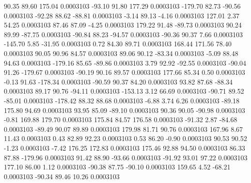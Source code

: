        90.35       89.60      175.04     0.0003103
      -93.10       91.80      177.29     0.0003103
     -179.70       82.73      -90.56     0.0003103
      -92.28       88.62      -88.81     0.0003103
       -3.14       89.13       -4.16     0.0003103
      127.01        2.37       54.25     0.0003103
       87.46       87.09       -4.25     0.0003103
      179.22       91.48      -89.73     0.0003103
       90.24       89.99      -87.75     0.0003103
      -90.84       88.23      -94.57     0.0003103
      -90.36       90.37        7.66     0.0003103
     -145.70        5.85      -31.95     0.0003103
        0.72       84.30       89.71     0.0003103
      168.44      171.56       78.40     0.0003103
       90.05       90.96       84.57     0.0003103
       89.06       90.12      -83.34     0.0003103
       -5.09       88.48       94.63     0.0003103
     -179.16       85.65      -89.86     0.0003103
        3.79       92.92      -92.55     0.0003103
      -90.04       91.26     -179.67     0.0003103
      -90.19       90.16       89.57     0.0003103
      177.66       85.34        0.50     0.0003103
       -0.13       91.63     -178.34     0.0003103
      -90.59       90.37       84.20     0.0003103
       93.82       87.68      -88.34     0.0003103
       89.17       90.76      -94.11     0.0003103
     -153.13        3.12       66.69     0.0003103
      -90.71       89.52      -85.01     0.0003103
     -178.42       88.32       88.68     0.0003103
       -6.88        3.74        6.26     0.0003103
      -89.18      175.80       94.69     0.0003103
       93.95       85.09      -89.10     0.0003103
       90.36       90.05      -90.98     0.0003103
       -0.81      169.88      179.70     0.0003103
      175.84       84.57      176.58     0.0003103
      -91.32        2.87      -84.68     0.0003103
      -89.49       90.07       89.89     0.0003103
      179.98       81.71       90.76     0.0003103
      167.96        8.67       11.43     0.0003103
        0.43       82.89       92.23     0.0003103
        0.53       86.20       -0.90     0.0003103
       90.53       90.52       -1.23     0.0003103
       -7.42      176.25      172.83     0.0003103
      175.46       92.88       94.50     0.0003103
       86.33       87.88     -179.96     0.0003103
       91.42       88.90      -93.66     0.0003103
      -91.92       93.01       97.22     0.0003103
      177.10       86.00        1.12     0.0003103
      -90.38       87.75      -90.10     0.0003103
      159.65        4.52      -68.21     0.0003103
      -90.34       89.46       10.26     0.0003103

